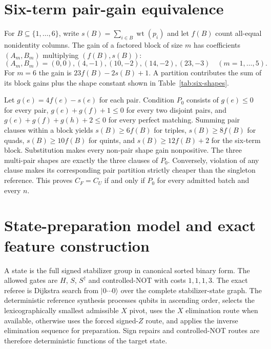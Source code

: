 \documentclass[a4paper,onecolumn,11pt,unpublished,noarxiv]{quantumarticle}
\begin{document}
\section{Six-term pair-gain equivalence}\label{sec:six-proof}

For $B\subseteq\{1,\ldots,6\}$, write $s(B)=\sum_{i\in B}\operatorname{wt}(p_i)$ and let $f(B)$ count all-equal nonidentity columns.  The gain of a factored block of size $m$ has coefficients $(A_m,B_m)$ multiplying $(f(B),s(B))$:
\begin{equation}
(A_m,B_m)=(0,0),(4,-1),(10,-2),(14,-2),(23,-3)\quad(m=1,\ldots,5).
\end{equation}
For $m=6$ the gain is $23f(B)-2s(B)+1$.  A partition contributes the sum of its block gains plus the shape constant shown in Table~\ref{tab:six-shapes}.

Let $g(e)=4f(e)-s(e)$ for each pair.  Condition $P_0$ consists of $g(e)\le0$ for every pair, $g(e)+g(f)+1\le0$ for every two disjoint pairs, and $g(e)+g(f)+g(h)+2\le0$ for every perfect matching.  Summing pair clauses within a block yields $s(B)\ge6f(B)$ for triples, $s(B)\ge8f(B)$ for quads, $s(B)\ge10f(B)$ for quints, and $s(B)\ge12f(B)+2$ for the six-term block.  Substitution makes every non-pair shape gain nonpositive.  The three multi-pair shapes are exactly the three clauses of $P_0$.  Conversely, violation of any clause makes its corresponding pair partition strictly cheaper than the singleton reference.  This proves $C_F=C_U$ if and only if $P_0$ for every admitted batch and every $n$.

\SixShapeTable
\FloatBarrier

\section{State-preparation model and exact feature construction}\label{sec:state-protocol}

A state is the full signed stabilizer group in canonical sorted binary form.  The allowed gates are $H$, $S$, $S^\dagger$ and controlled-NOT with costs $1,1,1,3$.  The exact referee is Dijkstra search from $|0\cdots0\rangle$ over the complete stabilizer-state graph.  The deterministic reference synthesis processes qubits in ascending order, selects the lexicographically smallest admissible $X$ pivot, uses the $X$ elimination route when available, otherwise uses the forced signed-$Z$ route, and applies the inverse elimination sequence for preparation.  Sign repairs and controlled-NOT routes are therefore deterministic functions of the target state.
\end{document}
